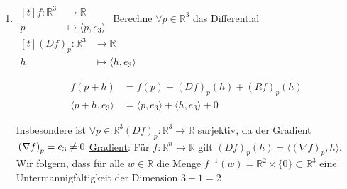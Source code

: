 \documentclass[../main.tex]{subfiles}
\begin{document}
\begin{examples}
\leavevmode
\begin{enumerate}
    \item $\begin{aligned}[t]
        f \colon  \mathbb{R}^3 & \to \mathbb{R} \\
        p  & \mapsto \langle p, e_3 \rangle
    \end{aligned}$
    Berechne $\forall p \in \mathbb{R}^3$ das Differential
    $\begin{aligned}[t]\left(Df\right)_p \colon \mathbb{R}^3 & \to \mathbb{R} \\
    h & \mapsto \langle h,e_3 \rangle
    \end{aligned}$
    
    \begin{recall}[Dreigliedentwicklung]
    \begin{align*}
    f(p+h) &= f(p) + \left(Df\right)_p(h) + \left(Rf\right)_p(h) \\
    \langle p+h, e_3 \rangle &= \langle p, e_3 \rangle + \langle h, e_3 \rangle + 0
    \end{align*}
    \end{recall}
    Insbesondere ist $\forall p\in \mathbb{R}^3 \left(Df\right)_p \colon \mathbb{R}^3 \to \mathbb{R}$ surjektiv, da der Gradient $\\ \left(\nabla f \right)_p = e_3 \not = 0$ \quad \underline{Gradient}: Für $f \colon \mathbb{R}^n \to \mathbb{R}$ gilt $\left(Df\right)_p(h) = \langle \left(\nabla f\right)_p, h \rangle$. \\
    Wir folgern, dass für alle $w \in \mathbb{R}$ die Menge $f^{-1}(w)=\mathbb{R}^2 \times \{0\} \subset \mathbb{R}^3$ eine Untermannigfaltigkeit der Dimension $3-1=2$
    

\end{enumerate}
\end{examples}
\end{document}
